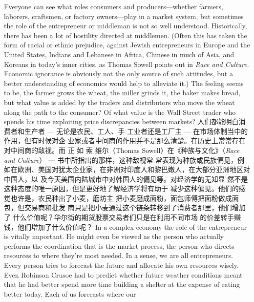 \begin{paracol}{2}
Everyone can see what roles consumers and producers---whether farmers, laborers, craftsmen, or factory owners---play
in a market system, but sometimes the role of the entrepreneur
or middleman is not so well understood. Historically, there has
been a lot of hostility directed at middlemen. (Often this has
taken the form of racial or ethnic prejudice, against Jewish entrepreneurs in Europe and the United States, Indians and
Lebanese in Africa, Chinese in much of Asia, and Koreans in
today's inner cities, as Thomas Sowell points out in \textit{Race and Culture}. Economic ignorance is obviously not the only source of
such attitudes, but a better understanding of economics would
help to alleviate it.) The feeling seems to be, the farmer grows
the wheat, the miller grinds it, the baker makes bread, but
what value is added by the traders and distributors who move
the wheat along the path to the consumer? Of what value is the
Wall Street trader who spends his time exploiting price discrepancies between markets?
\switchcolumn
人们都能明白消费者和生产者 --- 无论是农民、工人、手
工业者还是工厂主 --- 在市场体制当中的作用，但有时候对企
业家或者中间商的作用并不是那么清楚。在历史上常常存在对中间商的敌视。而 正 如 索 维尔（Thomas Sowell）在《种族与文化》（\textit{Race and Culture}） 一 书中所指出的那样，这种敌视常
常表现为种族或民族偏见，例如在欧洲、美国对犹太企业家，在非洲对印度人和黎巴嫩人，在大部分亚洲地区对中国人，以
及今天美国内陆城市中对韩国人的偏见等。对经济学的无知显
然不是这种态度的唯一原因，但是更好地了解经济学将有助于
减少这种偏见。他们的感觉也许是，农民种出了小麦，磨坊主
把小麦磨成面粉，面包师傅把面粉做成面包，但交易商和批发
商只是把小麦通过这个链条转移到了消费者那里，他们增加了
什么价值呢？华尔街的期货股票交易者们只是在利用不同市场
的价差转手赚钱，他们增加了什么价值呢？
\switchcolumn*
In a complex economy the role of the entrepreneur is vitally
important. He might even be viewed as the person who actually
performs the coordination that is the market process, the person who directs resources to where they're most needed. In a
sense, we are all entrepreneurs. Every person tries to forecast
the future and allocate his own resources wisely. Even Robinson
Crusoe had to predict whether future weather conditions meant
that he had better spend more time building a shelter at the expense of eating better today. Each of us forecasts where our

\end{paracol}
